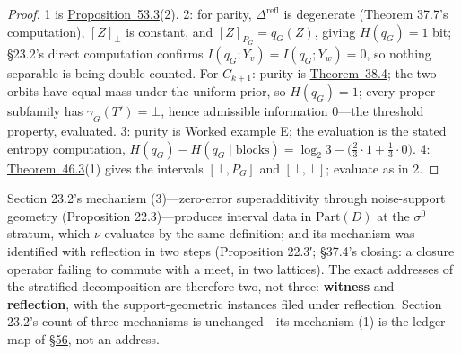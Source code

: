 \begin{proof}

1 is \hyperlink{stmt:53.3}{Proposition~53.3}(2). 2: for parity, \(\Delta^{\mathrm{refl}}\) is degenerate (Theorem 37.7's computation), \([Z]_\bot\) is constant, and \([Z]_{P_G} = q_G(Z)\), giving \(H(q_G) = 1\) bit; §23.2's direct computation confirms \(I(q_G; Y_v) = I(q_G; Y_w) = 0\), so nothing separable is being double-counted. For \(C_{k+1}\): purity is \hyperlink{stmt:38.4}{Theorem~38.4}; the two orbits have equal mass under the uniform prior, so \(H(q_G) = 1\); every proper subfamily has \(\gamma_G(T') = \bot\), hence admissible information \(0\)---\hspace{0pt}the threshold property, evaluated. 3: purity is Worked example E; the evaluation is the stated entropy computation, \(H(q_G) - H(q_G \mid \text{blocks}) = \log_2 3 - \big(\tfrac23 \cdot 1 + \tfrac13 \cdot 0\big)\). 4: \hyperlink{stmt:46.3}{Theorem~46.3}(1) gives the intervals \([\bot, P_G]\) and \([\bot, \bot]\); evaluate as in 2.
\end{proof}

\begin{thmrem}

Section 23.2's mechanism (3)---\hspace{0pt}zero-error superadditivity through noise-support geometry (Proposition 22.3)---\hspace{0pt}produces interval data in \(\mathrm{Part}(D)\) at the \(\sigma^0\) stratum, which \(\nu\) evaluates by the same definition; and its mechanism was identified with reflection in two steps (Proposition 22.3′; §37.4's closing: a closure operator failing to commute with a meet, in two lattices). The exact addresses of the stratified decomposition are therefore two, not three: \textbf{witness} and \textbf{reflection}, with the support-geometric instances filed under reflection. Section 23.2's count of three mechanisms is unchanged---\hspace{0pt}its mechanism (1) is the ledger map of \hyperlink{sec:56}{§56}, not an address.
\end{thmrem}


